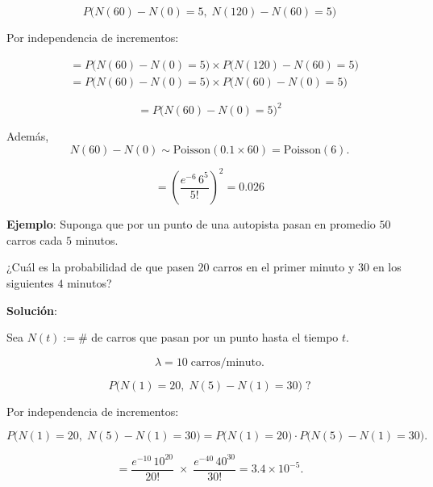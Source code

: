 \documentclass[12pt,a4paper]{article}
\begin{document}
\begin{equation*}
P\big(N(60) - N(0) = 5,\; N(120) - N(60) = 5\big)
\end{equation*}

Por independencia de incrementos:

\begin{align*}
&= P\big(N(60) - N(0) = 5\big) \times P\big(N(120) - N(60) = 5\big) \\
&= P\big(N(60) - N(0) = 5\big) \times P\big(N(60) - N(0) = 5\big)
\end{align*}

\begin{equation*}
= P\big(N(60) - N(0) = 5\big)^2
\end{equation*}

Además,
\begin{equation*}
N(60) - N(0) \sim \text{Poisson}(0.1 \times 60) = \text{Poisson}(6).
\end{equation*}

\begin{equation*}
= \left( \frac{e^{-6} \, 6^5}{5!} \right)^2 = 0.026
\end{equation*}

\textbf{Ejemplo}: Suponga que por un punto de una autopista pasan en promedio $50$ carros cada $5$ minutos.  

¿Cuál es la probabilidad de que pasen $20$ carros en el primer minuto y $30$ en los siguientes $4$ minutos?

\textbf{Solución}:

Sea $N(t) := \#$ de carros que pasan por un punto hasta el tiempo $t$.

\begin{equation*}
\lambda = 10 \; \text{carros/minuto}.
\end{equation*}

\begin{equation*}
P\big(N(1)=20,\; N(5)-N(1)=30\big)\; ?
\end{equation*}

Por independencia de incrementos:

\begin{equation*}
P\big(N(1)=20,\; N(5)-N(1)=30\big)
= P\big(N(1)=20\big)\cdot P\big(N(5)-N(1)=30\big).
\end{equation*}

\begin{equation*}
= \frac{e^{-10}\,10^{20}}{20!} \; \times \; \frac{e^{-40}\,40^{30}}{30!}
= 3.4 \times 10^{-5}.
\end{equation*}
\end{document}
